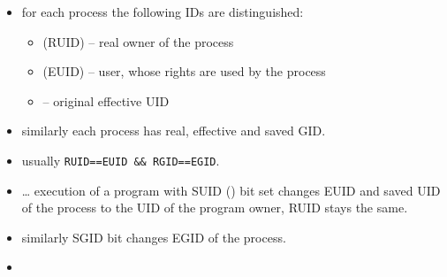\begin{slide}
\begin{itemize}
\item for each process the following IDs are distinguished:
    \begin{itemize}
    \item {} (RUID) -- real owner of the process
    \item {} (EUID) -- user, whose rights are used by the
process
    \item {} -- original effective UID
    \end{itemize}
\item similarly each process has real, effective and saved GID.
\item usually \texttt{RUID==EUID \&\& RGID==EGID}.
\item {} \dots{} execution of a program with
SUID () bit set changes EUID and saved UID of the process
to the UID of the program owner, RUID stays the same.
\item similarly SGID bit changes EGID of the process. 
\item {}
\end{itemize}
\end{slide}

\label{ROOT_SETUID}

